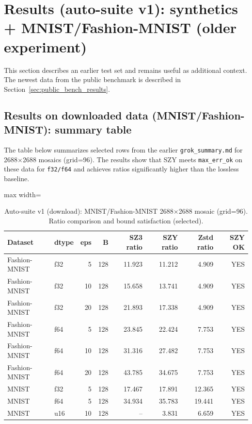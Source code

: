 \documentclass[11pt,a4paper]{article}
\begin{document}
\section{Results (auto-suite v1): synthetics + MNIST/Fashion-MNIST (older experiment)}

This section describes an earlier test set and remains useful as additional context. The newest data from the public benchmark is described in Section~\ref{sec:public_bench_results}.

\subsection{Results on downloaded data (MNIST/Fashion-MNIST): summary table}
The table below summarizes selected rows from the earlier \texttt{grok\_summary.md} for 2688$\times$2688 mosaics (grid=96).
The results show that SZY meets \texttt{max\_err\_ok} on these data for \texttt{f32/f64} and achieves ratios significantly higher than the lossless baseline.

\begin{table}[H]
\centering
\caption{Auto-suite v1 (download): MNIST/Fashion-MNIST 2688$\times$2688 mosaic (grid=96). Ratio comparison and bound satisfaction (selected).}
\label{tab:mnist_fashion_summary}
\begin{adjustbox}{max width=\textwidth}
\begin{tabular}{@{}llrrrrrr@{}}
\toprule
Dataset & dtype & eps & B & SZ3 ratio & SZY ratio & Zstd ratio & SZY OK \\
\midrule
Fashion-MNIST & f32 & 5  & 128 & 11.923 & 11.212 & 4.909 & YES \\
Fashion-MNIST & f32 & 10 & 128 & 15.658 & 13.741 & 4.909 & YES \\
Fashion-MNIST & f32 & 20 & 128 & 21.893 & 17.338 & 4.909 & YES \\
Fashion-MNIST & f64 & 5  & 128 & 23.845 & 22.424 & 7.753 & YES \\
Fashion-MNIST & f64 & 10 & 128 & 31.316 & 27.482 & 7.753 & YES \\
Fashion-MNIST & f64 & 20 & 128 & 43.785 & 34.675 & 7.753 & YES \\
MNIST         & f32 & 5  & 128 & 17.467 & 17.891 & 12.365 & YES \\
MNIST         & f64 & 5  & 128 & 34.934 & 35.783 & 19.441 & YES \\
MNIST         & u16 & 10 & 128 &   --   &  3.831 &  6.659 & YES \\
\bottomrule
\end{tabular}
\end{adjustbox}
\end{table}
\end{document}
